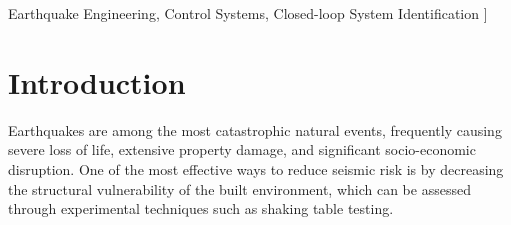 \documentclass[ 10pt, twocolumn]{article} %
\begin{document}
 Earthquake Engineering, Control Systems, Closed-loop System Identification
\vspace{3mm}
]%



\section{Introduction} %

Earthquakes are among the most catastrophic natural events, frequently causing severe loss of life, extensive property damage, and significant socio-economic disruption. One of the most effective ways to reduce seismic risk is by decreasing the structural vulnerability of the built environment, which can be assessed through experimental techniques such as shaking table testing. 
\end{document}
